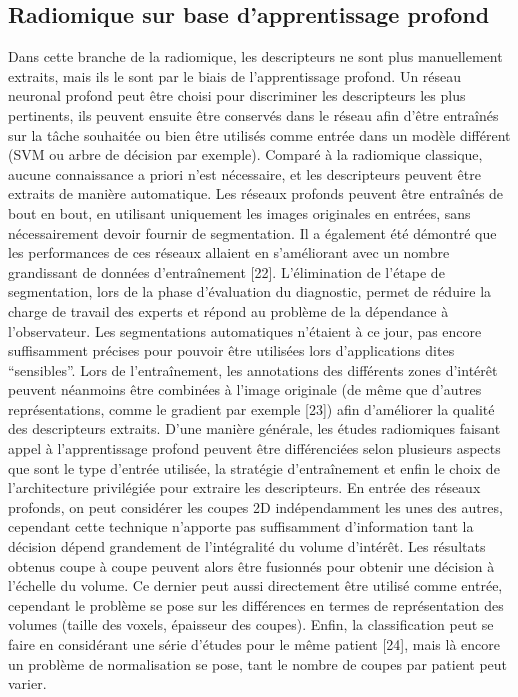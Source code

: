 \documentclass[]{memoir}
\begin{document}
\subsection{Radiomique sur base d’apprentissage profond}
Dans cette branche de la radiomique, les descripteurs ne sont plus manuellement extraits, mais ils le sont par le biais de l’apprentissage profond.
Un réseau neuronal profond peut être choisi pour discriminer les descripteurs les plus pertinents, ils peuvent ensuite être conservés dans le réseau afin d’être entraînés sur la tâche souhaitée ou bien être utilisés comme entrée dans un modèle différent (SVM ou arbre de décision par exemple).
Comparé à la radiomique classique, aucune connaissance a priori n’est nécessaire, et les descripteurs peuvent être extraits de manière automatique. Les réseaux profonds peuvent être entraînés de bout en bout, en utilisant uniquement les images originales en entrées, sans nécessairement devoir fournir de segmentation. Il a également été démontré que les performances de ces réseaux allaient en s’améliorant avec un nombre grandissant de données d’entraînement [22].
L’élimination de l’étape de segmentation, lors de la phase d’évaluation du diagnostic, permet de réduire la charge de travail des experts et répond au problème de la dépendance à l’observateur. Les segmentations automatiques n’étaient à ce jour, pas encore suffisamment précises pour pouvoir être utilisées lors d’applications dites “sensibles”.
Lors de l’entraînement, les annotations des différents zones d’intérêt peuvent néanmoins être combinées à l’image originale (de même que d’autres représentations, comme le gradient par exemple [23]) afin d’améliorer la qualité des descripteurs extraits.
D’une manière générale, les études radiomiques faisant appel à l’apprentissage profond peuvent être différenciées selon plusieurs aspects que sont le type d’entrée utilisée, la stratégie d’entraînement et enfin le choix de l’architecture privilégiée pour extraire les descripteurs.
En entrée des réseaux profonds, on peut considérer les coupes 2D indépendamment les unes des autres, cependant cette technique n’apporte pas suffisamment d’information tant la décision dépend grandement de l’intégralité du volume d’intérêt.
Les résultats obtenus coupe à coupe peuvent alors être fusionnés pour obtenir une décision à l’échelle du volume. Ce dernier peut aussi directement être utilisé comme entrée, cependant le problème se pose sur les différences en termes de représentation des volumes (taille des voxels, épaisseur des coupes). Enfin, la classification peut se faire en considérant une série d’études pour le même patient [24], mais là encore un problème de normalisation se pose, tant le nombre de coupes par patient peut varier.
\end{document}
